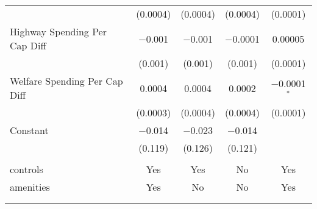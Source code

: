 \begin{table}[!htbp]
\begin{tabular}{@{\extracolsep{5pt}}lcccc}
  & (0.0004) & (0.0004) & (0.0004) & (0.0001) \\ 
  Highway Spending Per Cap Diff & $-$0.001 & $-$0.001 & $-$0.0001 & 0.00005 \\ 
  & (0.001) & (0.001) & (0.001) & (0.0001) \\ 
  Welfare Spending Per Cap Diff & 0.0004 & 0.0004 & 0.0002 & $-$0.0001$^{*}$ \\ 
  & (0.0003) & (0.0004) & (0.0004) & (0.0001) \\ 
  Constant & $-$0.014 & $-$0.023 & $-$0.014 &  \\ 
  & (0.119) & (0.126) & (0.121) &  \\ 
 \hline \\[-1.8ex] 
controls & Yes & Yes & No & Yes \\ 
amenities & Yes & No & No & Yes \\ 
\hline \\[-1.8ex] 
\hline 
\hline \\[-1.8ex] 
\end{tabular} 
\end{table} 
